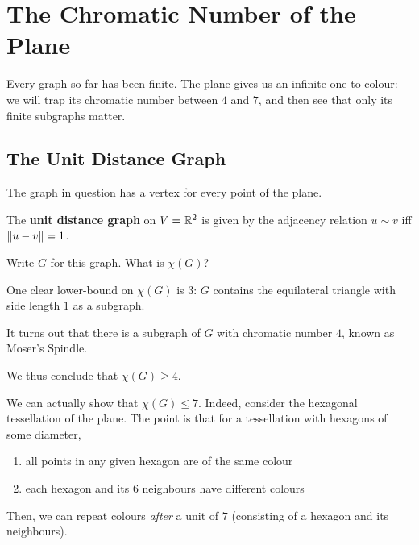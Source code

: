 \section{The Chromatic Number of the Plane}

Every graph so far has been finite. The plane gives us an infinite one to colour: we will trap its chromatic number between $4$ and $7$, and then see that only its finite subgraphs matter.

\subsection{The Unit Distance Graph}

The graph in question has a vertex for every point of the plane.

\begin{boxdefinition} \label{Ch2:Def:Unit_Distance_Graph}
    The \textbf{unit distance graph} on $V = \mathbb{R}^2$ is given by the adjacency relation $u \sim v$ iff $\left\lVert u - v \right\rVert = 1$.
\end{boxdefinition}

Write $G$ for this graph. What is $\chi(G)$?

One clear lower-bound on $\chi(G)$ is $3$: $G$ contains the equilateral triangle with side length $1$ as a subgraph.

It turns out that there is a subgraph of $G$ with chromatic number $4$, known as Moser's Spindle.
\begin{figure}[H]
    \centering
\end{figure}
We thus conclude that $\chi(G) \geq 4$.

We can actually show that $\chi(G) \leq 7$. Indeed, consider the hexagonal tessellation of the plane. The point is that for a tessellation with hexagons of some diameter,
\begin{enumerate}
    \item all points in any given hexagon are of the same colour
    \item each hexagon and its $6$ neighbours have different colours
\end{enumerate}
Then, we can repeat colours \textit{after} a unit of $7$ (consisting of a hexagon and its neighbours).

